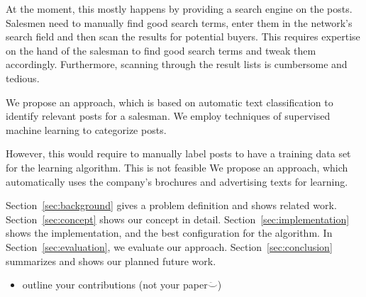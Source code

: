 At the moment, this mostly happens by providing a search engine on the posts.
Salesmen need to manually find good search terms, enter them in the network's search field and then scan the results for potential buyers.
This requires expertise on the hand of the salesman to find good search terms and tweak them accordingly.
Furthermore, scanning through the result lists is cumbersome and tedious.

We propose an approach, which is based on automatic text classification to identify relevant posts for a salesman.
We employ techniques of supervised machine learning to categorize posts.

However, this would require to manually label posts to have a training data set for the learning algorithm.
This is not feasible
We propose an approach, which automatically uses the company's brochures and advertising texts for learning.

Section~\ref{sec:background} gives a problem definition and shows related work.
Section~\ref{sec:concept} shows our concept in detail.
Section~\ref{sec:implementation} shows the implementation, and the best configuration for the algorithm.
In Section~\ref{sec:evaluation}, we evaluate our approach.
Section~\ref{sec:conclusion} summarizes and shows our planned future work.

\begin{itemize}
	\item outline your contributions (not your paper$\ddot\smile$)
\end{itemize}
